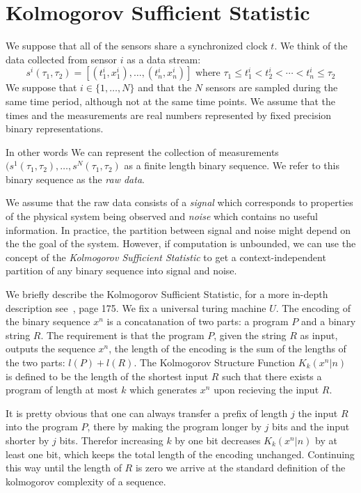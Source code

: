 \documentclass[11pt]{article}
\begin{document}
\section{Kolmogorov Sufficient Statistic}

We suppose that all of the sensors share a synchronized clock $t$.
We think of the data collected from sensor $i$ as a data stream:
\[
s^i(\tau_1,\tau_2)=[(t^i_1,x^i_1),\ldots,(t^i_n,x^i_n)]
\mbox{ where } \tau_1\leq t^i_1 < t^i_2<\cdots < t^i_n \leq \tau_2
\]
We suppose that $i \in \{1,\ldots,N\}$ and that the $N$ sensors are
sampled during the same time period, although not at the same time
points. We assume that the times and the measurements are real numbers
represented by fixed precision binary representations.

In other words We can represent the collection of measurements
$(s^1(\tau_1,\tau_2),\ldots,s^N(\tau_1,\tau_2)$ as a finite length
binary sequence. We refer to this binary sequence as the {\em raw
  data}.

We assume that the raw data consists of a {\em signal} which
corresponds to properties of the physical system being observed and
{\em noise} which contains no useful information. In practice, the
partition between signal and noise might depend on the the goal of the
system. However, if computation is unbounded, we can use the concept
of the {\em Kolmogorov Sufficient Statistic} to get a
context-independent partition of any binary sequence into signal and
noise.

We briefly describe the Kolmogorov Sufficient Statistic, for a more
in-depth description see~\cite{CoverThomas}, page 175. We fix a
universal turing machine $U$. The encoding of the binary sequence
$x^n$ is a concatanation of two parts: a program $P$ and a binary
string $R$. The requirement is that the program $P$, given the string
$R$ as input, outputs the sequence $x^n$, the length of the encoding
is the sum of the lengths of the two parts: $l(P)+l(R)$.  The
Kolmogorov Structure Function $K_k(x^n|n)$ is defined to be the length
of the shortest input $R$ such that there exists a program of length
at most $k$ which generates $x^n$ upon recieving the input $R$.

It is pretty obvious that one can always transfer a prefix of length
$j$ the input $R$ into the program $P$, there by making the program
longer by $j$ bits and the input shorter by $j$ bits. Therefor
increasing $k$ by one bit decreases  $K_k(x^n|n)$ by at least one bit,
which keeps the total length of the encoding unchanged. Continuing
this way until the length of $R$ is zero we arrive at the standard
definition of the kolmogorov complexity of a sequence.
\end{document}
